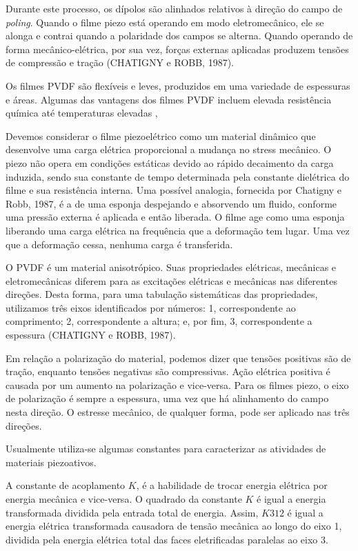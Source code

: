 \documentclass[
	12pt,				
	oneside,			
	a4paper,			
	english,			
	brazil,			
	]{abntex2ppgsi}
\begin{document}
Durante este processo, os dípolos são alinhados relativos à direção do campo de \textit{poling}. Quando o filme piezo está operando em modo eletromecânico, ele se alonga e contrai quando a polaridade dos campos se alterna. Quando operando de forma mecânico-elétrica, por sua vez, forças externas aplicadas produzem tensões de compressão e tração (CHATIGNY e ROBB, 1987). 

Os filmes PVDF são flexíveis e leves, produzidos em uma variedade de espessuras e áreas. Algumas das vantagens dos filmes PVDF incluem elevada resistência química até temperaturas elevadas , 

Devemos considerar o filme piezoelétrico como um material dinâmico que desenvolve uma carga elétrica proporcional a mudança no stress mecânico. O piezo não opera em condições estáticas devido ao rápido decaimento da carga induzida, sendo sua constante de tempo determinada pela constante dielétrica do filme e sua resistência interna. 	Uma possível analogia, fornecida por Chatigny e Robb, 1987, é a de uma esponja despejando e absorvendo um fluido, conforme uma pressão externa é aplicada e então liberada. O filme age como uma esponja liberando uma carga elétrica na frequência que a deformação tem lugar. Uma vez que a deformação cessa, nenhuma carga é transferida. 

O PVDF é um material anisotrópico.  Suas propriedades elétricas, mecânicas e eletromecânicas diferem para as excitações elétricas e mecânicas nas diferentes direções. Desta forma, para uma tabulação sistemáticas das propriedades, utilizamos três eixos identificados por números: 1, correspondente ao comprimento; 2, correspondente a altura; e, por fim, 3, correspondente a espessura (CHATIGNY e ROBB, 1987). 

Em relação a polarização do material, podemos dizer que tensões positivas são de tração, enquanto tensões negativas são compressivas. Ação elétrica positiva é causada por um aumento na polarização e vice-versa. Para os filmes piezo, o eixo de polarização é sempre a espessura, uma vez que há alinhamento do campo nesta direção. O estresse mecânico, de qualquer forma, pode ser aplicado nas três direções. 

Usualmente utiliza-se algumas constantes para caracterizar as atividades de materiais piezoativos. 

A constante de acoplamento $K$, é a habilidade de trocar energia elétrica por energia mecânica e vice-versa. O quadrado da constante $K$ é igual a energia transformada dividida pela entrada total de energia. Assim, $K312$ é igual a energia elétrica transformada causadora de tensão mecânica ao longo do eixo 1, dividida pela energia elétrica total das faces eletrificadas paralelas ao eixo 3. 
\end{document}
